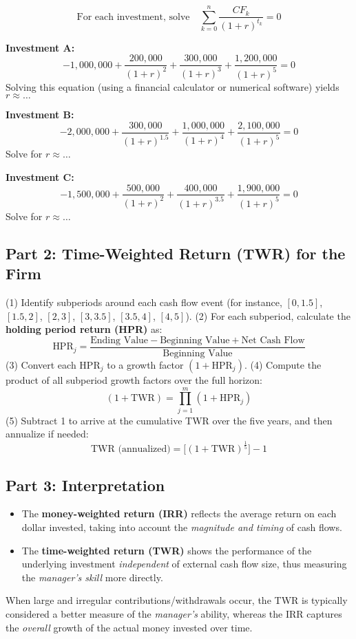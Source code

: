 \[
\text{For each investment, solve} \quad \sum_{k=0}^{n} \frac{CF_k}{(1 + r)^{t_k}} = 0
\]

\textbf{Investment A:}
\[
-1{,}000{,}000
+ \frac{200{,}000}{(1 + r)^2}
+ \frac{300{,}000}{(1 + r)^3}
+ \frac{1{,}200{,}000}{(1 + r)^5}
= 0
\]
Solving this equation (using a financial calculator or numerical software) yields \(r \approx \dots\)
 
\textbf{Investment B:}
\[
-2{,}000{,}000
+ \frac{300{,}000}{(1 + r)^{1.5}}
+ \frac{1{,}000{,}000}{(1 + r)^4}
+ \frac{2{,}100{,}000}{(1 + r)^5}
= 0
\]
Solve for \(r \approx \dots\)

\textbf{Investment C:}
\[
-1{,}500{,}000
+ \frac{500{,}000}{(1 + r)^2}
+ \frac{400{,}000}{(1 + r)^{3.5}}
+ \frac{1{,}900{,}000}{(1 + r)^5}
= 0
\]
Solve for \(r \approx \dots\)

\subsection*{Part 2: Time-Weighted Return (TWR) for the Firm}

(1) Identify subperiods around each cash flow event (for instance, \([0,1.5]\), \([1.5,2]\), \([2,3]\), \([3,3.5]\), \([3.5,4]\), \([4,5]\)).  
(2) For each subperiod, calculate the \textbf{holding period return (HPR)} as:
\[
\text{HPR}_j = \frac{\text{Ending Value} - \text{Beginning Value} + \text{Net Cash Flow}}{\text{Beginning Value}}
\]
(3) Convert each \(\text{HPR}_j\) to a growth factor \((1 + \text{HPR}_j)\).  
(4) Compute the product of all subperiod growth factors over the full horizon:  
\[
(1 + \text{TWR}) = \prod_{j=1}^{m} (1 + \text{HPR}_j)
\]
(5) Subtract 1 to arrive at the cumulative TWR over the five years, and then annualize if needed:  
\[
\text{TWR (annualized)} = \bigl[(1 + \text{TWR})^{\frac{1}{5}}\bigr] - 1
\]

\subsection*{Part 3: Interpretation}
\begin{itemize}
\item The \textbf{money-weighted return (IRR)} reflects the average return on each dollar invested, taking into account the \emph{magnitude and timing} of cash flows. 
\item The \textbf{time-weighted return (TWR)} shows the performance of the underlying investment \emph{independent} of external cash flow size, thus measuring the \emph{manager's skill} more directly. 
\end{itemize}
When large and irregular contributions/withdrawals occur, the TWR is typically considered a better measure of the \emph{manager's} ability, whereas the IRR captures the \emph{overall} growth of the actual money invested over time.

